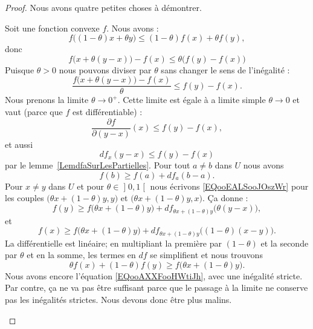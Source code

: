 \begin{proof}
	Nous avons quatre petites choses à démontrer.
	\begin{subproof}
		Soit une fonction convexe \( f\). Nous avons :
		\begin{equation}
			f\big( (1-\theta)x+\theta y \big)\leq (1-\theta)f(x)+\theta f(y),
		\end{equation}
		donc
		\begin{equation}
			f\big( x+\theta(y-x) \big)-f(x)\leq \theta\big( f(y)-f(x) \big)
		\end{equation}
		Puisque \( \theta>0\) nous pouvons diviser par \( \theta\) sans changer le sens de l'inégalité :
		\begin{equation}        \label{EQooAXXFooHWtiJh}
			\frac{ f\big( x+\theta(y-x) \big)-f(x) }{ \theta }\leq f(y)-f(x).
		\end{equation}
		Nous prenons la limite \( \theta\to 0^+\). Cette limite est égale à a limite simple \( \theta\to 0\) et vaut (parce que \( f\) est différentiable) :
		\begin{equation}
			\frac{ \partial f }{ \partial (y-x) }(x)\leq f(y)-f(x),
		\end{equation}
		et aussi
		\begin{equation}
			df_x(y-x)\leq f(y)-f(x)
		\end{equation}
		par le lemme~\ref{LemdfaSurLesPartielles}.
		Pour tout \( a\neq b\) dans \( U\) nous avons
		\begin{equation}        \label{EQooEALSooJOszWr}
			f(b)\geq f(a)+df_a(b-a).
		\end{equation}
		Pour \( x\neq y\) dans \( U\) et pour \( \theta\in\mathopen] 0 , 1 \mathclose[\) nous écrivons \eqref{EQooEALSooJOszWr} pour les couples \( \big( \theta x+(1-\theta)y,y \big)\) et \( \big( \theta x+(1-\theta)y,x \big)\). Ça donne :
		\begin{equation}
			f(y)\geq f\big( \theta x+(1-\theta)y \big)+df_{\theta x+(1-\theta)y}\big( \theta(y-x) \big),
		\end{equation}
		et
		\begin{equation}
			f(x)\geq f\big( \theta x+(1-\theta)y \big)+df_{\theta x+(1-\theta)y}\big( (1-\theta)(x-y) \big).
		\end{equation}
		La différentielle est linéaire; en multipliant la première par \( (1-\theta)\) et la seconde par \( \theta\) et en la somme, les termes en \( df\) se simplifient et nous trouvons
		\begin{equation}
			\theta f(x)+(1-\theta)f(y)\geq f\big( \theta x+(1-\theta)y \big).
		\end{equation}
		Nous avons encore l'équation \eqref{EQooAXXFooHWtiJh}, avec une inégalité stricte. Par contre, ça ne va pas être suffisant parce que le passage à la limite ne conserve pas les inégalités strictes. Nous devons donc être plus malins.


\end{subproof}
\end{proof}
